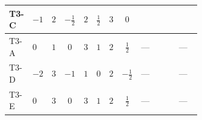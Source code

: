 \documentclass[8pt]{article}
\begin{document}
\begin{landscape}
\begin{longtable}{@{}llcccccc >{\raggedright\arraybackslash}p{0.21\linewidth} >{\raggedright\arraybackslash}p{0.21\linewidth} >{\raggedright\arraybackslash}p{0.21\linewidth}@{}}
T3-C & $-1$ & $2$ & $-\frac{1}{2}$ & $2$ & $\frac{1}{2}$ & $3$ & $0$ & \scriptsize\adjustbox{max width=\linewidth}{$\begin{gathered} +{\lambda_{H H^\dagger S_1^\dagger S_2^\dagger}^{\rm Cross}} (4 \left({\lambda_{H H^\dagger S_1^\dagger S_2^\dagger}^{\rm Cross}}\right)^{*}+3 \left({\lambda_{S_1 S_1^{\dagger 2}S_2^\dagger}}\right)^{*})\end{gathered}$} & \scriptsize\adjustbox{max width=\linewidth}{$\begin{gathered} +6 {\lambda_{T3}} \left({\lambda_{T3}}\right)^{*}\end{gathered}$} & \scriptsize\adjustbox{max width=\linewidth}{$\begin{gathered} +\frac{9 {g_2}^4}{4}\end{gathered}$} \\
\midrule
T3-A & $0$ & $1$ & $0$ & $3$ & $1$ & $2$ & $\frac{1}{2}$ & --- & \scriptsize\adjustbox{max width=\linewidth}{$\begin{gathered} +12 {\lambda_{T3}} \left({\lambda_{T3}}\right)^{*}\end{gathered}$} & --- \\
\midrule
T3-D & $-2$ & $3$ & $-1$ & $1$ & $0$ & $2$ & $-\frac{1}{2}$ & --- & \scriptsize\adjustbox{max width=\linewidth}{$\begin{gathered} +4 {\lambda_{T3}} \left({\lambda_{T3}}\right)^{*}\end{gathered}$} & --- \\
\midrule
T3-E & $0$ & $3$ & $0$ & $3$ & $1$ & $2$ & $\frac{1}{2}$ & --- & \scriptsize\adjustbox{max width=\linewidth}{$\begin{gathered} +4 {\lambda_{T3}} \left({\lambda_{T3}}\right)^{*}\end{gathered}$} & --- \\
\midrule
\bottomrule
\end{longtable}
\clearpage

\end{landscape}
\end{document}
